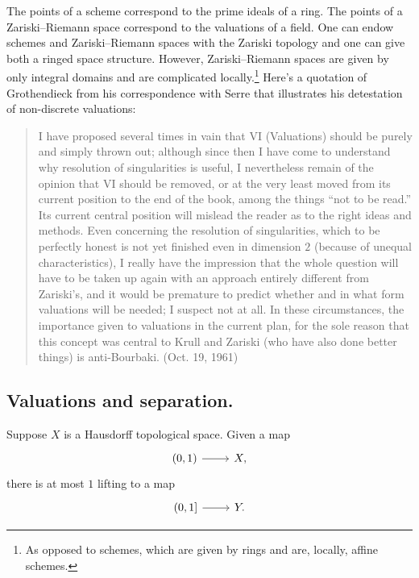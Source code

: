 \documentclass [11 pt, oneside] {article}
\begin{document}
The points of a scheme correspond to the prime ideals of a ring. The points of a Zariski--Riemann space correspond to the valuations of a field. One can endow schemes and Zariski--Riemann spaces with the Zariski topology and one can give both a ringed space structure. However, Zariski--Riemann spaces are given by only integral domains and are complicated locally.\footnote{As opposed to schemes, which are given by rings and are, locally, affine schemes.} Here's a quotation of Grothendieck from his correspondence with Serre that illustrates his detestation of non-discrete valuations:
\begin{quote}
	\small I have proposed several times in vain that VI (Valuations) should be purely and simply thrown out; although since then I have come to understand why resolution of singularities is useful, I nevertheless remain of the opinion that VI should be removed, or at the very least moved from its current position to the end of the book, among the things ``not to be read.'' Its current central position will mislead the reader as to the right ideas and methods. Even concerning the resolution of singularities, which to be perfectly honest is not yet finished even in dimension $2$ (because of unequal characteristics), I really have the impression that the whole question will have to be taken up again with an approach entirely different from Zariski's, and it would be premature to predict whether and in what form valuations will be needed; I suspect not at all. In these circumstances, the importance given to valuations in the current plan, for the sole reason that this concept was central to Krull and Zariski (who have also done better things) is anti-Bourbaki. (Oct. 19, 1961)
\end{quote}

\subsection{Valuations and separation.}
Suppose $X$ is a Hausdorff topological space. Given a map 
\[
\begin{tikzcd}
(0,1)\ar[r]& X,
\end{tikzcd}
\] 
there is at most $1$ lifting to a map
\[
\begin{tikzcd}
(0,1]\ar[r]& Y.
\end{tikzcd}
\] 
\end{document}
